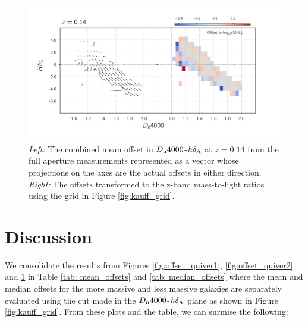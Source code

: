 \begin{figure}
\includegraphics[width=\textwidth]{figures/mlz_offset_c.pdf}
\caption[ \emph{Left:} The combined mean offset in $D_{\rm n}4000$-$h\delta_{\rm A}$ at $z=0.14$ from the full aperture measurements represented as a vector whose projections on the axes are the actual offsets in either direction. \emph{Right:} The offsets transformed to the z-band mass-to-light ratios using the grid in Figure \ref{fig:kauff_grid}. ]{ \emph{Left:} The combined mean offset in $D_{\rm n}4000$-$h\delta_{\rm A}$ at $z=0.14$ from the full aperture measurements represented as a vector whose projections on the axes are the actual offsets in either direction. \emph{Right:} The offsets transformed to the z-band mass-to-light ratios using the grid in Figure \ref{fig:kauff_grid}.
\label{fig:offset_quiver3}}
\end{figure}

\section{Discussion}

We consolidate the results from Figures \ref{fig:offset_quiver1}, \ref{fig:offset_quiver2} and \ref{fig:offset_quiver3} in Table \ref{tab: mean_offsets} and  \ref{tab: median_offsets} where the mean and median offsets for the more massive and less massive galaxies are separately evaluated using the cut made in the $D_{\rm n}4000$-$h\delta_{\rm A}$ plane as shown in Figure \ref{fig:kauff_grid}. From these plots and the table, we can surmise the following:

